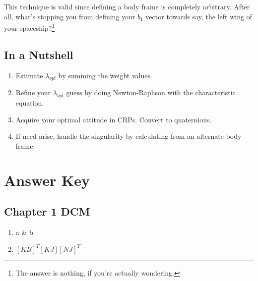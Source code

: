 \documentclass[a4paper,14pt]{extreport}
\begin{document}
This technique is valid since defining a body frame is completely arbitrary. After all, what's stopping you from defining your $b_1$ vector towards say, the left wing of your spaceship?\footnote{The answer is nothing, if you're actually wondering.}
\section{In a Nutshell}
\begin{enumerate}
\item{Estimate \(\lambda_{opt}\) by summing the weight values.}
\item{Refine your \(\lambda_{opt}\) guess by doing Newton-Raphson with the characteristic equation.}
\item{Acquire your optimal attitude in CRPs. Convert to quaternions.}
\item{If need arise, handle the singularity by calculating from an alternate body frame.} 
\end{enumerate}
\chapter{Answer Key}
\section{Chapter 1 DCM}
\begin{enumerate}
\item{a \& b}
\item{$[KB]^T[KJ][NJ]^T$}


\end{enumerate}
\end{document}
